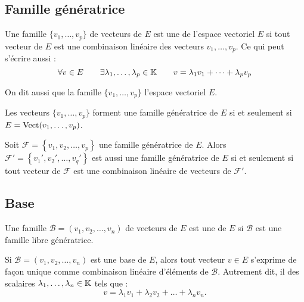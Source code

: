 \documentclass[10pt,class=article,crop=false]{standalone}
\begin{document}
\begin{multicols}{2}
\subsection{Famille génératrice}


Une famille $\{v_1,\dots ,v_p\}$ de vecteurs de $E$ est une  de l'espace vectoriel $E$
si tout vecteur de $E$ est une combinaison linéaire des vecteurs $v_1,\dots ,v_p$.
Ce qui peut s'écrire aussi :
$$\forall v \in E  \qquad \exists \lambda_1, \ldots,\lambda_p \in \mathbb{K} \qquad
v=\lambda_1 v_1+\cdots + \lambda_p v_p$$


On dit aussi que la famille $\{v_1,\dots ,v_p\}$  l'espace vectoriel $E$.

Les vecteurs $\{v_1,\dots ,v_p\}$ forment une famille génératrice de $E$
si et seulement si $E=\operatorname{Vect} (v_1,\ldots,v_p)$.


\begin{proposition}
Soit $\mathcal{F} = \left\{ v_1, v_2, \dots , v_p\right\}$ une famille génératrice de $E$.
Alors $\mathcal{F}' = \left\{ v_1', v_2', \dots , v_q'\right\}$ est aussi une famille
génératrice de $E$ si et seulement si tout vecteur de $\mathcal{F}$
est une combinaison linéaire de vecteurs de $\mathcal{F}'$.
\end{proposition}



\subsection{Base}


Une famille $\mathcal{B}= (v_1, v_2, \dots , v_n)$ de vecteurs de $E$
est une  de $E$
si $\mathcal{B}$ est une famille libre  génératrice.

\begin{theoreme}
\label{th:coordonnees}
Si $\mathcal{B} = (v_1, v_2, \dots , v_n)$ est une base de $E$, alors
tout vecteur $v \in E$ s'exprime de façon unique comme combinaison
linéaire d'éléments de $\mathcal{B}$.
Autrement dit, il  des scalaires $\lambda_1,\ldots,\lambda_n \in \mathbb{K}$
 tels que :
$$v = \lambda_1 v_1 + \lambda_2 v_2 + \dots + \lambda_n v_n.$$
\end{theoreme}


\end{multicols}
\end{document}
